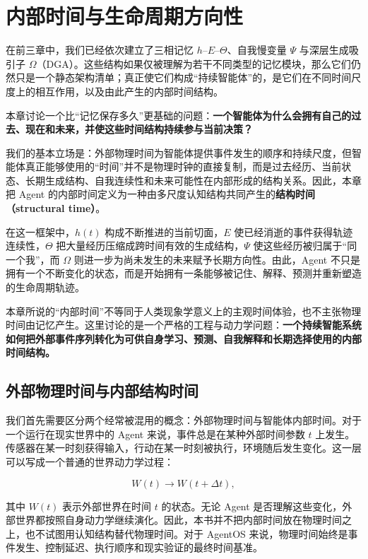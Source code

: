 \chapter{内部时间与生命周期方向性}

\begin{chapterlead}
在前三章中，我们已经依次建立了三相记忆 $h$--$E$--$\Theta$、自我慢变量 $\Psi$ 与深层生成吸引子 $\Omega$（DGA）。这些结构如果仅被理解为若干不同类型的记忆模块，那么它们仍然只是一个静态架构清单；真正使它们构成“持续智能体”的，是它们在不同时间尺度上的相互作用，以及由此产生的内部时间结构。

本章讨论一个比“记忆保存多久”更基础的问题：\textbf{一个智能体为什么会拥有自己的过去、现在和未来，并使这些时间结构持续参与当前决策？}

我们的基本立场是：外部物理时间为智能体提供事件发生的顺序和持续尺度，但智能体真正能够使用的“时间”并不是物理时钟的直接复制，而是过去经历、当前状态、长期生成结构、自我连续性和未来可能性在内部形成的结构关系。因此，本章把 Agent 的内部时间定义为一种由多尺度认知结构共同产生的\textbf{结构时间（structural time）}。

在这一框架中，$h(t)$ 构成不断推进的当前切面，$E$ 使已经消逝的事件获得轨迹连续性，$\Theta$ 把大量经历压缩成跨时间有效的生成结构，$\Psi$ 使这些经历被归属于“同一个我”，而 $\Omega$ 则进一步为尚未发生的未来赋予长期方向性。由此，Agent 不只是拥有一个不断变化的状态，而是开始拥有一条能够被记住、解释、预测并重新塑造的生命周期轨迹。

本章所说的“内部时间”不等同于人类现象学意义上的主观时间体验，也不主张物理时间由记忆产生。这里讨论的是一个严格的工程与动力学问题：\textbf{一个持续智能系统如何把外部事件序列转化为可供自身学习、预测、自我解释和长期选择使用的内部时间结构。}
\end{chapterlead}

\section{外部物理时间与内部结构时间}

我们首先需要区分两个经常被混用的概念：外部物理时间与智能体内部时间。对于一个运行在现实世界中的 Agent 来说，事件总是在某种外部时间参数 $t$ 上发生。传感器在某一时刻获得输入，行动在某一时刻被执行，环境随后发生变化。这一层可以写成一个普通的世界动力学过程：

\[
W(t)
\longrightarrow
W(t+\Delta t),
\]

其中 $W(t)$ 表示外部世界在时间 $t$ 的状态。无论 Agent 是否理解这些变化，外部世界都按照自身动力学继续演化。因此，本书并不把内部时间放在物理时间之上，也不试图用认知结构替代物理时间。对于 AgentOS 来说，物理时间始终是事件发生、控制延迟、执行顺序和现实验证的最终时间基准。

